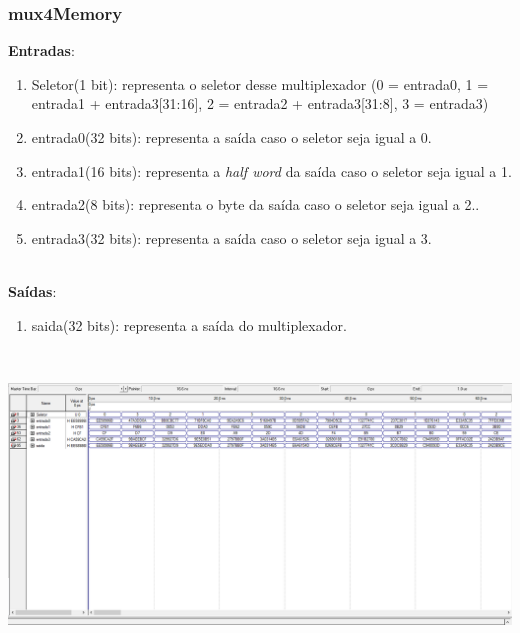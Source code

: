 \documentclass{article}
\begin{document}
    \newpage
    \subsubsection{mux4Memory}
    \textbf{Entradas}:
    \begin{enumerate}
        \item Seletor(1 bit): representa o seletor desse multiplexador (0 = entrada0, 1 = entrada1 + entrada3[31:16], 2 = entrada2 + entrada3[31:8], 3 = entrada3)
        \item entrada0(32 bits): representa a saída caso o seletor seja igual a 0.
        \item entrada1(16 bits): representa a {\it half word} da saída caso o seletor seja igual a 1.
        \item entrada2(8 bits): representa o byte da saída caso o seletor seja igual a 2..
        \item entrada3(32 bits): representa a saída caso o seletor seja igual a 3.\\
    \end{enumerate}
    \\
    \textbf{Saídas}:
    \begin{enumerate}
        \item saida(32 bits): representa a saída do multiplexador.\\
    \end{enumerate}\\
    \begin{center}
        \includegraphics[scale=0.4]{mux4Memory.PNG}
    \end{center}
    \\
    \newpage
\end{document}
